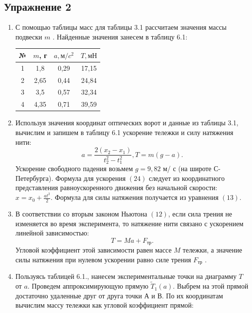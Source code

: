 \documentclass[12pt]{article}
\begin{document}
\subsection*{Упражнение 2}
\begin{enumerate}
\item С помощью таблицы масс для таблицы 3.1 рассчитаем значения массы подвески
$m$ . Найденные значения занесем в таблицу 6.1:
\begin{table}[h!]
\begin{center}
\begin{tabular}{|c|c|c|c|}
\hline
 № & $m$, г & $a, м/c^2$   & $T, мН$ \\
\hline
 1 &1,8	&0,29&	17,15\\
\hline
 2 & 2,65	&0,44	&24,84\\
\hline
 3 &  3,5&	0,57	&32,34 \\
\hline
 4 &  4,35	&0,71	&39,59	\\
\hline
\end{tabular}
\end{center}
\end{table}
\item Используя значения координат оптических ворот и данные из таблицы 3.1,
вычислим и запишем в таблицу 6.1 ускорение тележки и силу натяжения
нити:
\begin{equation}
a=\frac{2(x_{2}-x_{1})}{t^2_{2}-t^2_{1}}, T =m(g-a).
\end{equation}
Ускорение свободного падения возьмем $g = 9,82$ м/ с (на широте С-Петербурга).
Формула для ускорения $(24)$ следует из координатного представления
равноускоренного движения без начальной скорости: $x =x_0 +  \frac{at^2}{2} $. Формула
для силы натяжения получается из уравнения $(13)$.
\newpage
\item В соответствии со вторым законом Ньютона $(12)$, если
сила трения не изменяется во время эксперимента, то натяжение нити связано с
ускорением линейной зависимостью:
\begin{equation}
T = Ma+F_{тр}.
\end{equation}
Угловой коэффициент этой зависимости равен массе $M$ тележки, а значение
силы натяжения при нулевом ускорении равно силе трения $F_{тр}$ .
\item Пользуясь таблицей 6.1., нанесем экспериментальные точки на диаграмму $T$ от
$a$. Проведем аппроксимирующую прямую $\widetilde{T}_{1}(a)$. Выбрем на этой
прямой достаточно удаленные друг от друга
точки А и В. По их координатам вычислим
массу тележки как угловой коэффициент
прямой:
\begin{equation}

\end{equation}
\end{enumerate}
\end{document}
